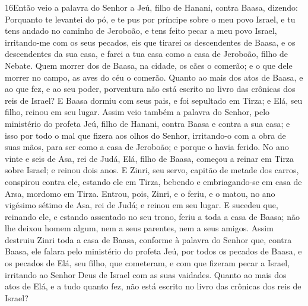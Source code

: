 \lettrine{16} Então veio a palavra do Senhor a Jeú, filho de
Hanani, contra Baasa, dizendo: Porquanto te levantei do pó, e te
pus por príncipe sobre o meu povo Israel, e tu tens andado no
caminho de Jeroboão, e tens feito pecar a meu povo Israel,
irritando-me com os seus pecados, eis que tirarei os
descendentes de Baasa, e os descendentes da sua casa, e farei a tua
casa como a casa de Jeroboão, filho de Nebate. Quem morrer dos
de Baasa, na cidade, os cães o comerão; e o que dele morrer no
campo, as aves do céu o comerão. Quanto ao mais dos atos de
Baasa, e ao que fez, e ao seu poder, porventura não está escrito no
livro das crônicas dos reis de Israel? E Baasa dormiu com seus
pais, e foi sepultado em Tirza; e Elá, seu filho, reinou em seu
lugar. Assim veio também a palavra do Senhor, pelo ministério do
profeta Jeú, filho de Hanani, contra Baasa e contra a sua casa; e
isso por todo o mal que fizera aos olhos do Senhor, irritando-o com
a obra de suas mãos, para ser como a casa de Jeroboão; e porque o
havia ferido. No ano vinte e seis de Asa, rei de Judá, Elá,
filho de Baasa, começou a reinar em Tirza sobre Israel; e reinou
dois anos. E Zinri, seu servo, capitão de metade dos carros,
conspirou contra ele, estando ele em Tirza, bebendo e embriagando-se
em casa de Arsa, mordomo em Tirza. Entrou, pois, Zinri, e o
feriu, e o matou, no ano vigésimo sétimo de Asa, rei de Judá; e
reinou em seu lugar. E sucedeu que, reinando ele, e estando
assentado no seu trono, feriu a toda a casa de Baasa; não lhe deixou
homem algum, nem a seus parentes, nem a seus amigos. Assim
destruiu Zinri toda a casa de Baasa, conforme à palavra do Senhor
que, contra Baasa, ele falara pelo ministério do profeta Jeú,
por todos os pecados de Baasa, e os pecados de Elá, seu
filho, que cometeram, e com que fizeram pecar a Israel, irritando ao
Senhor Deus de Israel com as suas vaidades. Quanto ao mais
dos atos de Elá, e a tudo quanto fez, não está escrito no livro das
crônicas dos reis de Israel?

